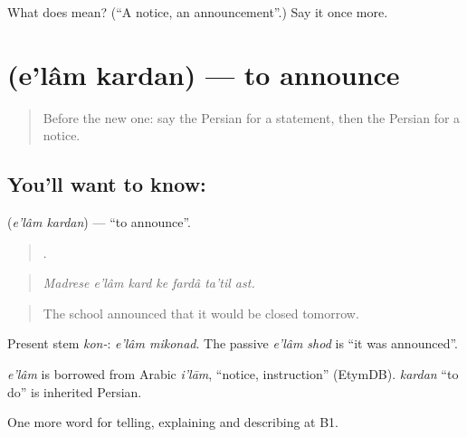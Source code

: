\begin{tcolorbox}[breakable,colback=teal!4,colframe=teal!35!black,title={Before you move on}]
What does  mean? (\textquotedblleft{}A notice, an announcement\textquotedblright{}.) Say it once more.
\end{tcolorbox}
\section[\texorpdfstring{\fa{اعلام} \fa{کردن} (e'lâm kardan)}{اعلام کردن (e'lâm kardan)}]{  (e'lâm kardan) — to announce}

\label{lesson:FA-C309-elam-kardan}



\begin{quote}
Before the new one: say the Persian for a statement, then the Persian for a notice.
\end{quote}

\subsection*{You'll want to know:  }
\textbf{ } (\emph{e'lâm kardan}) — \textquotedblleft{}to announce\textquotedblright{}.

\begin{quote}
      .
\end{quote}

\begin{quote}
\emph{Madrese e'lâm kard ke fardâ ta'til ast.}
\end{quote}

\begin{quote}
The school announced that it would be closed tomorrow.
\end{quote}

Present stem \emph{kon-}: \emph{e'lâm mikonad}. The passive \emph{e'lâm shod} is \textquotedblleft{}it was announced\textquotedblright{}.

\begin{cousinweb}
\emph{e'lâm} is borrowed from Arabic \emph{i'lām}, \textquotedblleft{}notice, instruction\textquotedblright{} (EtymDB). \emph{kardan} \textquotedblleft{}to do\textquotedblright{} is inherited Persian.
\end{cousinweb}

\begin{grammarlens}[title={What you've built}]
One more word for telling, explaining and describing at B1.
\end{grammarlens}

